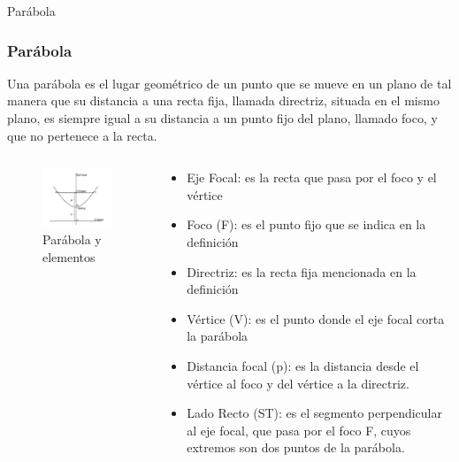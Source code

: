 \documentclass[xcolor={dvipsnames},aspectratio=169,10pt]{beamer}
\begin{document}
\begin{frame}{Parábola}
  \frametitle{Parábola}
  Una parábola es el lugar geométrico de un punto que se mueve en un plano de tal manera que su distancia a una recta fija, llamada directriz, situada en el mismo plano, 
  es siempre igual a su distancia a un punto fijo del plano, llamado foco, y que no pertenece a la recta.

  \begin{columns}
    \begin{column}{0.5\textwidth}
      \begin{figure}
        \includegraphics[width=\textwidth, height=0.6\textheight, keepaspectratio]{images/par1.png}
        \caption{Parábola y elementos}
      \end{figure}
    \end{column}
    \begin{column}{0.5\textwidth}
      \begin{itemize}\small
        \itemsep0em
        \item Eje Focal: es la recta que pasa por el foco y el vértice
        \item Foco (F): es el punto fijo que se indica en la definición
        \item Directriz: es la recta fija mencionada en la definición
        \item Vértice (V): es el punto donde el eje focal corta la parábola
        \item Distancia focal (p): es la distancia desde el vértice al foco y del vértice a la directriz.
        \item Lado Recto (ST): es el segmento perpendicular al eje focal, que pasa por el foco F, cuyos extremos son dos puntos de la parábola.
      \end{itemize}
    \end{column}
  \end{columns}
\end{frame}
\end{document}
